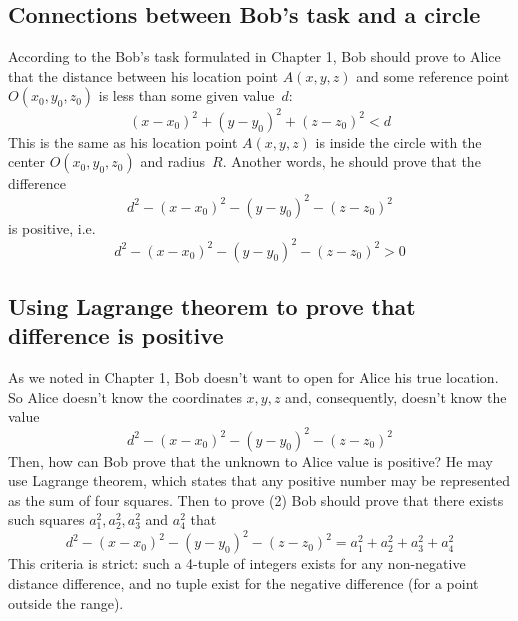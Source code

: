 \documentclass{article}
\begin{document}
\subsection{Connections between Bob’s task and a circle}  %
According to the Bob’s task formulated in Chapter 1,
Bob should prove to Alice that the distance between his location point $A(x, y, z)$  
and some reference point $O(x_0, y_0, z_0)$ is less than some given value~$d$:
\begin{equation}
  (x - x_0)^2 + (y - y_0)^2 + (z - z_0)^2 < d
\end{equation}
This is the same as his location point $A(x, y, z)$ is inside the circle with the center $O(x_0, y_0, z_0)$ and radius~$R$.
Another words, he should prove that the difference
\begin{equation}
  d^2 - (x - x_0)^2 - (y - y_0)^2 - (z - z_0)^2
\end{equation}
is positive, i.e.
\begin{equation}
  d^2 - (x - x_0)^2 - (y - y_0)^2 - (z - z_0)^2 > 0
\end{equation}

\subsection{Using Lagrange theorem to prove that difference is positive}  %
As we noted in Chapter 1, Bob doesn’t want to open for Alice his true location.
So Alice doesn’t know the coordinates $x, y, z$ and, consequently, doesn’t know the value
\begin{equation}
  d^2 - (x - x_0)^2 - (y - y_0)^2 - (z - z_0)^2
\end{equation}
Then, how can Bob prove that the unknown to Alice value is positive?
He may use Lagrange theorem, which states that any positive number may be represented as the sum of four squares.
Then to prove (2) Bob should prove that there exists such squares $a_1^2, a_2^2, a_3^2$ and $a_4^2$ that
\begin{equation}
  d^2 - (x - x_0)^2 - (y - y_0)^2 - (z - z_0)^2 = a_1^2 + a_2^2 + a_3^2 + a_4^2
\end{equation}
This criteria is strict: such a 4-tuple of integers exists for any non-negative distance difference,
and no tuple exist for the negative difference (for a point outside the range).
\end{document}
